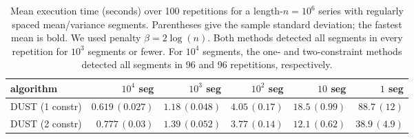 \documentclass{article}
\begin{document}
\begin{table}[!ht]
\caption{Mean execution time (seconds) over 100 repetitions for a length-$n=10^6$ series with regularly spaced mean/variance segments. Parentheses give the sample standard deviation; the fastest mean is bold. We used penalty $\beta=2\log(n)$. Both methods detected all segments in every repetition for $10^3$ segments or fewer. For $10^4$ segments, the one- and two-constraint methods detected all segments in 96 and 96 repetitions, respectively.}\label{tab:meanVar-time}
\begin{tabular}{l|rrrrr}
algorithm & $10^4$ seg & $10^3$ seg & $10^2$ seg & $10$ seg & $1$ seg \\
\hline
DUST (1 constr) & $\mathbf{0.619}\,(0.027)$ & $\mathbf{1.18}\,(0.048)$ & $4.05\,(0.17)$ & $18.5\,(0.99)$ & $88.7\,(12)$ \\
DUST (2 constr) & $0.777\,(0.03)$ & $1.39\,(0.052)$ & $\mathbf{3.77}\,(0.14)$ & $\mathbf{12.1}\,(0.62)$ & $\mathbf{38.9}\,(4.9)$ \\
\end{tabular}
\end{table}
\end{document}
